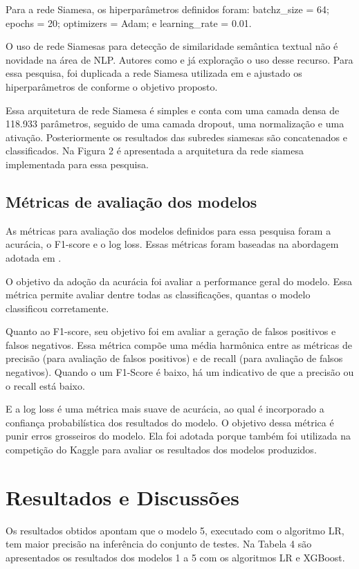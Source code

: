 \documentclass[conference]{IEEEtran}
\begin{document}
Para a rede Siamesa, os hiperparâmetros definidos foram: batchz\_size = 64; epochs = 20; optimizers = Adam; e learning\_rate = 0.01.

O uso de rede Siamesas para detecção de similaridade semântica textual não é novidade na área de NLP. Autores como \cite{Neculoiu2016} e \cite{Ranasinghe2019} já exploração o uso desse recurso. Para essa pesquisa, foi duplicada a rede Siamesa utilizada em \cite{Ritvik2021} e ajustado os hiperparâmetros de conforme o objetivo proposto.

Essa arquitetura de rede Siamesa é simples e conta com uma camada densa de 118.933 parâmetros, seguido de uma camada dropout, uma normalização e uma ativação. Posteriormente os resultados das subredes siamesas são concatenados e classificados. Na Figura 2 é apresentada a arquitetura da rede siamesa implementada para essa pesquisa.


\subsection{Métricas de avaliação dos modelos}

As métricas para avaliação dos modelos definidos para essa pesquisa foram a acurácia, o F1-score e o log loss. Essas métricas foram baseadas na abordagem adotada em \cite{sharma2019}.

O objetivo da adoção da acurácia foi avaliar a performance geral do modelo. Essa métrica permite avaliar dentre todas as classificações, quantas o modelo classificou corretamente. 

Quanto ao F1-score, seu objetivo foi em avaliar a geração de falsos positivos e falsos negativos. Essa métrica compõe uma média harmônica entre as métricas de precisão (para avaliação de falsos positivos) e de recall (para avaliação de falsos negativos). Quando o um F1-Score é baixo, há um indicativo de que a precisão ou o recall está baixo.

E a log loss é uma métrica mais suave de acurácia, ao qual é incorporado a confiança probabilística dos resultados do modelo. O objetivo dessa métrica é punir erros grosseiros do modelo. Ela foi adotada porque também foi utilizada na competição do Kaggle para avaliar os resultados dos modelos produzidos.

\section{Resultados e Discussões}

Os resultados obtidos apontam que o modelo 5, executado com o algoritmo LR, tem maior precisão na inferência do conjunto de testes. Na Tabela 4 são apresentados os resultados dos modelos 1 a 5 com os algoritmos LR e XGBoost.
\end{document}
